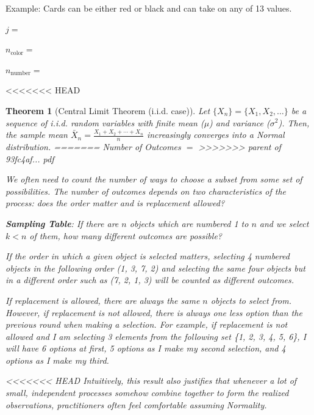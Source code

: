 \documentclass[]{book}
\newtheorem{theorem}{Theorem}[chapter]
\theoremstyle{definition}
\theoremstyle{definition}
\theoremstyle{definition}
\theoremstyle{remark}
\begin{document}
Example: Cards can be either red or black and can take on any of 13 values.

\(j =\)

\(n_{\text{color}} =\)

\(n_{\text{number}} =\)

<<<<<<< HEAD
\begin{theorem}[Central Limit Theorem (i.i.d. case)]
\protect\hypertarget{thm:clt}{}{\label{thm:clt} {} }Let \(\{X_n\} = \{X_1, X_2, \ldots\}\) be a sequence of i.i.d. random variables with finite mean (\(\mu\)) and variance (\(\sigma^2\)). Then, the sample mean \(\bar{X}_n = \frac{X_1 + X_2 + \cdots + X_n}{n}\) increasingly converges into a Normal distribution.
=======
Number of Outcomes \(=\)
>>>>>>> parent of 93fc4af... pdf

We often need to count the number of ways to choose a subset from some set of possibilities. The number of outcomes depends on two characteristics of the process: does the order matter and is replacement allowed?

\textbf{Sampling Table}: If there are \(n\) objects which are numbered 1 to \(n\) and we select \(k < n\) of them, how many different outcomes are possible?

If the order in which a given object is selected matters, selecting 4 numbered objects in the following order (1, 3, 7, 2) and selecting the same four objects but in a different order such as (7, 2, 1, 3) will be counted as different outcomes.

If replacement is allowed, there are always the same \(n\) objects to select from. However, if replacement is not allowed, there is always one less option than the previous round when making a selection. For example, if replacement is not allowed and I am selecting 3 elements from the following set \{1, 2, 3, 4, 5, 6\}, I will have 6 options at first, 5 options as I make my second selection, and 4 options as I make my third.

<<<<<<< HEAD
Intuitively, this result also justifies that whenever a lot of small, independent processes somehow combine together to form the realized observations, practitioners often feel comfortable assuming Normality.
\end{theorem}
\end{document}
